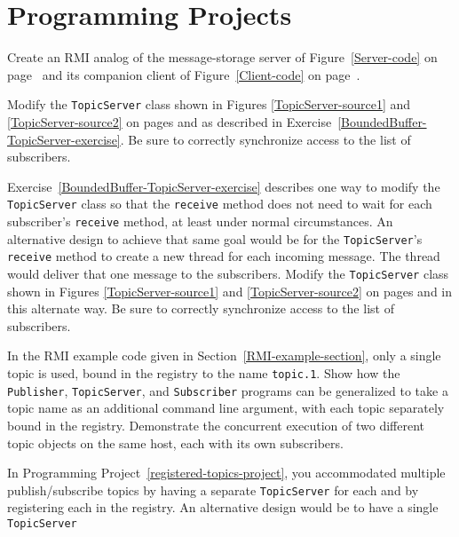 \section*{Programming Projects}
\begin{chapterEnumerate}
\item
Create an RMI analog of the
message-storage server of Figure~\ref{Server-code} on
page~\pageref{Server-code} and its companion client of
Figure~\ref{Client-code} on page~\pageref{Client-code}.
\item\label{BoundedBuffer-TopicServer-project}
Modify the {\tt TopicServer} class shown in
Figures \ref{TopicServer-source1} and \ref{TopicServer-source2} on pages \pageref{TopicServer-source1} and \pageref{TopicServer-source2}
as described in Exercise~\ref{BoundedBuffer-TopicServer-exercise}.  Be
sure to correctly synchronize access to the list of subscribers.
\item\label{Spawning-TopicServer-project}
Exercise~\ref{BoundedBuffer-TopicServer-exercise} describes one way to
modify the {\tt TopicServer} class so that the {\tt receive} method
does not need to wait for each subscriber's {\tt receive} method, at least
under normal circumstances.  An alternative design to achieve that
same goal would be for the {\tt TopicServer}'s {\tt receive} method to
create a new thread for each incoming message.  The thread would deliver
that one message to the subscribers.  Modify the {\tt TopicServer} class shown in
Figures \ref{TopicServer-source1} and \ref{TopicServer-source2} on pages \pageref{TopicServer-source1} and \pageref{TopicServer-source2}
in this alternate way.  Be
sure to correctly synchronize access to the list of subscribers.
\item\label{registered-topics-project}
In the RMI example code given in Section~\ref{RMI-example-section}, only a single topic
is used, bound in the registry to the name {\tt topic.1}.  Show how
the {\tt Publisher}, {\tt TopicServer}, and {\tt Subscriber} programs
can be generalized to take a topic name as an additional command line
argument, with each topic separately bound in the registry.
Demonstrate the concurrent execution of two different topic objects on
the same host,
each with its own subscribers.
\item\label{multi-topic-server-project}
In Programming Project~\ref{registered-topics-project}, you
accommodated multiple publish/\linebreak[0]subscribe topics by having a separate
{\tt TopicServer} for each and by registering each in the registry.
An alternative design would be to have a single {\tt TopicServer}

\end{chapterEnumerate}
